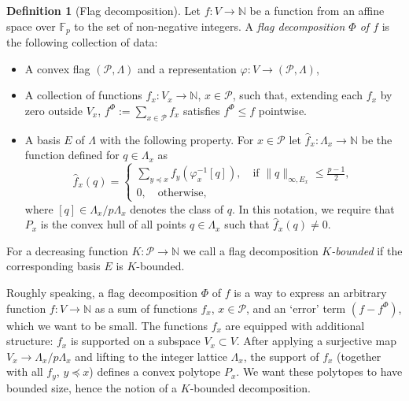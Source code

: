 \documentclass{daj}
\renewcommand{\le}{\leqslant}
\newcommand{\N}{\mathbb N}
\newcommand{\FF}{\mathbb F}
\renewcommand{\P}{\mathcal P}
\theoremstyle{definition}
\newtheorem{defi}[theorem]{Definition}
\theoremstyle{remark}
\theoremstyle{definition}
\theoremstyle{definition}
\begin{document}
\begin{defi}[Flag decomposition]\label{flagd}
Let $f: V\rightarrow \N$ be a function from an affine space over $\FF_p$ to the set of non-negative integers.
A {\em flag decomposition $\Phi$ of $f$} is the following collection of data:
\begin{itemize}
    \item A convex flag $(\P, \Lambda)$ and a representation $\varphi: V \rightarrow (\P, \Lambda)$,
    \item A collection of functions $f_x: V_x \rightarrow \N$, $x \in \P$, such that, extending each $f_x$ by zero outside $V_x$, $f^\Phi := \sum_{x \in \P} f_x$ satisfies $f^\Phi \le f$ pointwise.
    \item A basis $E$ of $\Lambda$ with the following property. For $x \in \P$ let $\hat f_x: \Lambda_x \rightarrow \N$ be the function defined for $q \in \Lambda_x$ as
    \[
    \hat f_x(q) = \begin{cases}
        \sum_{y \preceq x} f_y(\varphi^{-1}_x [q]), \quad \text{if }\|q\|_{\infty, E_x} \le \frac{p-1}{2},\\
        0, \quad \text{otherwise},
    \end{cases}
    \]
    where $[q] \in \Lambda_x / p\Lambda_x$ denotes the class of $q$.
    In this notation, we require that $P_x$ is the convex hull of all points $q \in \Lambda_x$ such that $\hat f_x(q) \neq 0$.
\end{itemize}
\end{defi}


For a decreasing function $K: \P \rightarrow \N$ we call
a flag decomposition {\em $K$-bounded} if the corresponding basis $E$ is $K$-bounded.

Roughly speaking, a flag decomposition $\Phi$ of $f$ is a way to express an arbitrary function $f: V \rightarrow \N$ as a sum of functions $f_x$, $x \in \P$, and an `error' term $(f-f^\Phi)$, which we want to be small. The functions $f_x$ are equipped with additional structure: $f_x$ is supported on a subspace $V_x \subset V$. After applying a surjective map $V_x \rightarrow \Lambda_x / p \Lambda_x$ and lifting to the integer lattice $\Lambda_x$, the support of $f_x$ (together with all $f_y$, $y \preceq x$) defines a convex polytope $P_x$. We want these polytopes to have bounded size, hence the notion of a $K$-bounded decomposition.
\end{document}
